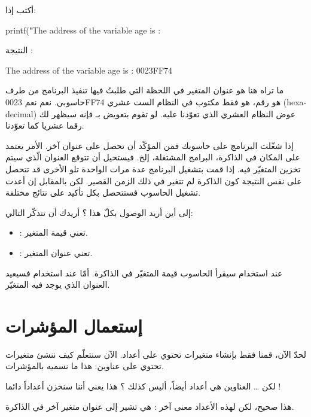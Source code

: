 أكتب إذا:
\begin{Csource}
printf("The address of the variable age is  : %
\end{Csource}
النتيجة :
\begin{Console}
The address of the variable age is : 0023FF74
\end{Console}
ما تراه هنا هو عنوان المتغير
في اللحظة التي طلبتُ فيها تنفيذ البرنامج من طرف حاسوبي. نعم نعم 0023FF74 هو رقم، هو فقط مكتوب في النظام الست عشري
(\textenglish{hexadecimal})
عوض النظام العشري الذي تعوّدنا عليه. لو تقوم بتعويض
بـ
فإنه سيظهر لك رقما عشريا كما تعوّدنا.
\begin{information}
	إذا شغّلت البرنامج على حاسوبك فمن المؤكّد أن تحصل على عنوان آخر. الأمر يعتمد على المكان في الذاكرة، البرامج المشتغلة، إلخ.
فيستحيل أن تتوقع العنوان الّذي سيتم تخزين المتغيّر فيه.
إذا قمت بتشغيل البرنامج عدة مرات الواحدة تلو الأخرى قد تتحصل على نفس النتيجة كون الذاكرة لم تتغير في ذلك الزمن القصير.
لكن بالمقابل إن أعدت تشغيل الحاسوب فستتحصل بكل تأكيد على نتائج مختلفة.
\end{information}
إلى أين أريد الوصول بكلّ هذا ؟ أريدك أن تتذكّر التالي:
\begin{itemize}
	\item {} : تعني قيمة المتغير.
	\item {} : تعني عنوان المتغير.
\end{itemize}
عند استخدام
سيقرأ الحاسوب قيمة المتغيّر في الذاكرة. أمّا عند استخدام
فسيعيد العنوان الذي يوجد فيه المتغيّر.

\section{إستعمال المؤشرات}
لحدّ الآن، قمنا فقط بإنشاء متغيرات تحتوي على أعداد. الآن سنتعلّم كيف ننشئ متغيرات تحتوي على عناوين: هذا ما نسميه بالمؤشرات.
\begin{question}
	لكن … العناوين هي أعداد أيضاً، أليس كذلك ؟ هذا يعني أننا سنخزن أعداداً دائما !
\end{question}
هذا صحيح، لكن لهذه الأعداد معنى آخر : هي تشير إلى عنوان متغير آخر في الذاكرة.

